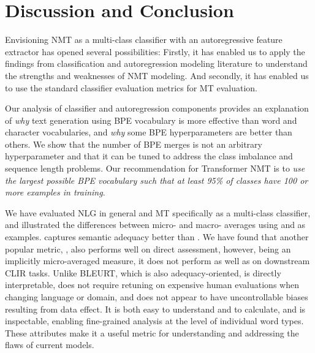 \section{Discussion and Conclusion}
\label{sec:conclusion}
Envisioning NMT as a multi-class classifier with an autoregressive feature extractor has opened several possibilities:
Firstly, it has enabled us to apply the findings from classification and autoregression modeling literature to understand the strengths and weaknesses of NMT modeling. And secondly, it has enabled us to use the standard classifier evaluation metrics for MT evaluation.

Our analysis of classifier and autoregression components provides an explanation of \textit{why} text generation using BPE vocabulary is more effective than word and character vocabularies, and \textit{why} some BPE hyperparameters are better than others.
We show that the number of BPE merges is not an arbitrary hyperparameter and that it can be tuned to address the class imbalance and sequence length problems. Our recommendation for Transformer NMT is to \textit{use the largest possible BPE vocabulary such that at least 95\% of classes have 100 or more examples in training}. 

We have evaluated NLG in general and MT specifically as a multi-class classifier, and illustrated the differences between micro- and macro- averages using  and  as examples.
 captures semantic adequacy better than .
We have found that another popular metric, , also performs well on direct assessment,
however, being an implicitly micro-averaged measure, it does not perform as well as  on downstream CLIR tasks.
Unlike BLEURT, which is also adequacy-oriented,  is directly interpretable, does not require retuning on expensive human evaluations when changing language or domain, and does not appear to have uncontrollable biases resulting from data effect.
It is both easy to understand and to calculate, and is  
inspectable, enabling fine-grained analysis at the level of individual word types. These attributes make it a useful metric for understanding and addressing the flaws of current models. 

